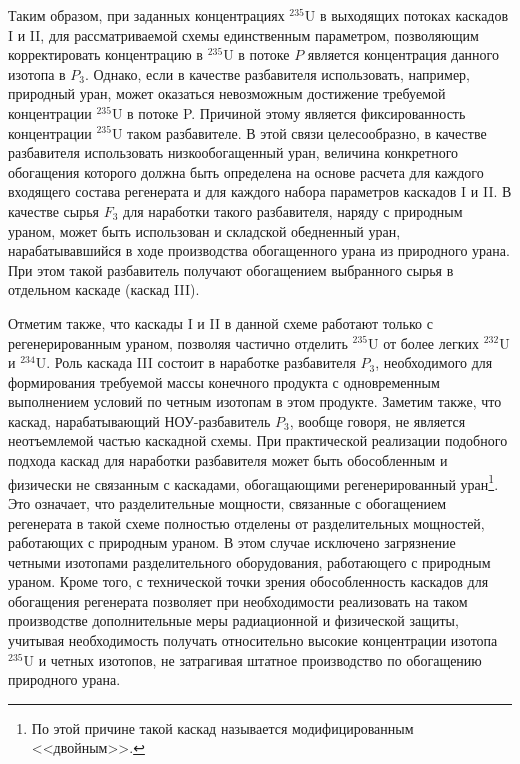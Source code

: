 Таким образом, при заданных концентрациях $^{235}$U в выходящих потоках каскадов I и II, для рассматриваемой схемы единственным параметром, позволяющим корректировать концентрацию в $^{235}$U в потоке $P$ является концентрация данного изотопа в $P_{3}$. Однако, если в качестве разбавителя использовать, например, природный уран, может оказаться невозможным достижение требуемой концентрации $^{235}$U в потоке P. Причиной этому является фиксированность концентрации $^{235}$U таком разбавителе. В этой связи целесообразно, в качестве разбавителя использовать низкообогащенный уран, величина конкретного обогащения которого должна быть определена на основе расчета для каждого входящего состава регенерата и для каждого набора параметров каскадов I и II. В качестве сырья $F_3$ для наработки такого разбавителя, наряду с природным ураном, может быть использован и складской обедненный уран, нарабатывавшийся в ходе производства обогащенного урана из природного урана. При этом такой разбавитель получают обогащением выбранного сырья в отдельном каскаде (каскад III).

Отметим также, что каскады I и II в данной схеме работают только с регенерированным ураном, позволяя частично отделить $^{235}$U от более легких $^{232}$U и $^{234}$U. Роль каскада III состоит в наработке разбавителя $P_{3}$, необходимого для формирования требуемой массы конечного продукта с одновременным выполнением условий по четным изотопам в этом продукте. Заметим также, что каскад, нарабатывающий НОУ-разбавитель $P_{3}$, вообще говоря, не является неотъемлемой частью каскадной схемы. При практической реализации подобного подхода каскад для наработки разбавителя может быть обособленным и физически не связанным с каскадами, обогащающими регенерированный уран\footnote{По этой причине такой каскад называется модифицированным <<двойным>>.}. Это означает, что разделительные мощности, связанные с обогащением регенерата в такой схеме полностью отделены от разделительных мощностей, работающих с природным ураном. В этом случае исключено загрязнение четными изотопами разделительного оборудования, работающего с природным ураном. Кроме того, с технической точки зрения обособленность каскадов для обогащения регенерата позволяет при необходимости реализовать на таком производстве дополнительные меры радиационной и физической защиты, учитывая необходимость получать относительно высокие концентрации изотопа $^{235}$U и четных изотопов, не затрагивая штатное производство по обогащению природного урана.

